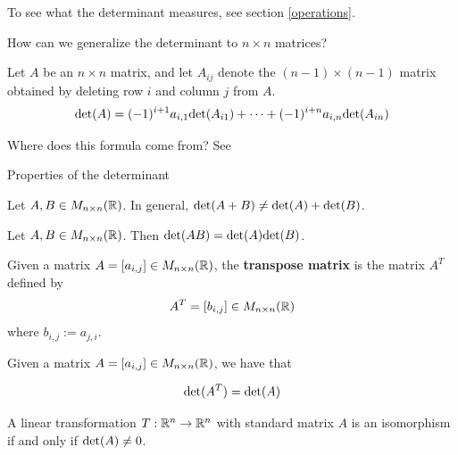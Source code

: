 To see what the determinant measures, see section \ref{operations}.


\begin{motivating}
How can we generalize the determinant to $n \times n$ matrices?
\end{motivating}

\begin{theorem}
    Let $A$ be an $n \times n$ matrix, and let $A_{ij}$ denote the $(n-1) \times (n-1)$ matrix obtained by deleting row $i$ and column $j$ from $A$.
    $$\textnormal{det}(A) = (-1)^{i+1}a_{i,1}\textnormal{det}(A_{i1}) + \cdots +  (-1)^{i+n}a_{i,n}\textnormal{det}(A_{in})$$
    
    \end{theorem}

Where does this formula come from? See 




Properties of the determinant
    
    \begin{remark}
    Let $A, B \in M_{n \times n}(\mathbb{R})$. In general, $\textnormal{det}(A+B) \neq \textnormal{det}(A) + \textnormal{det}(B)$.
    \end{remark}
    
    \begin{theorem}

    Let $A, B \in M_{n \times n}(\mathbb{R})$.  Then $\textnormal{det}(AB) = \textnormal{det}(A)\textnormal{det}(B)$.
     
    \end{theorem}
    
    


\begin{definition}
    Given a matrix $A = [a_{i,j}] \in M_{n\times n}(\mathbb{R})$, the \textbf{transpose matrix} is the matrix $A^T$ defined by $$A^T = [b_{i,j}] \in M_{n\times n}(\mathbb{R})$$
    where $b_{i,j} := a_{j,i}$.
\end{definition}

\begin{theorem}
Given a matrix $A = [a_{i,j}] \in M_{n\times n}(\mathbb{R})$, we have that 

$$\textnormal{det}(A^T) = \textnormal{det}(A)$$
\end{theorem}


\begin{theorem}
    A linear transformation $T: \mathbb{R}^n \to \mathbb{R}^n$ with standard matrix $A$ is an isomorphism if and only if $\textnormal{det}(A) \neq 0$.
    \end{theorem}

